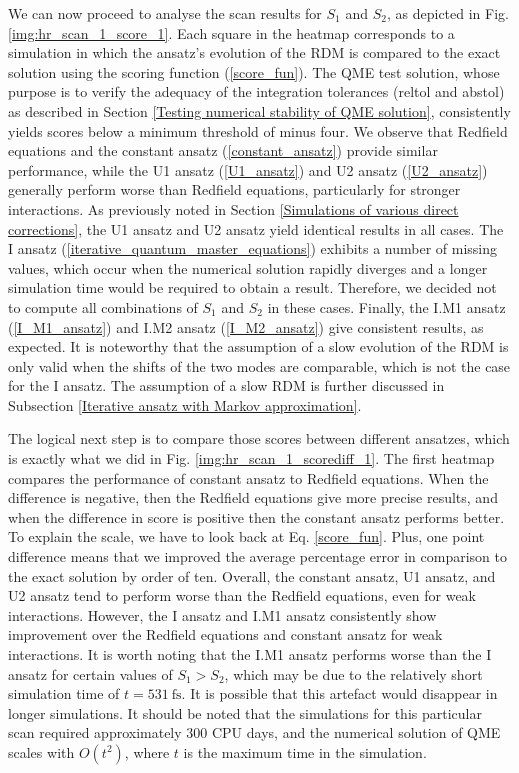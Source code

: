 We can now proceed to analyse the scan results for $S_1$ and $S_2$, as depicted in Fig. \ref{img:hr_scan_1_score_1}. Each square in the heatmap corresponds to a simulation in which the ansatz's evolution of the RDM is compared to the exact solution using the scoring function (\ref{score_fun}). The QME test solution, whose purpose is to verify the adequacy of the integration tolerances (reltol and abstol) as described in Section \ref{Testing numerical stability of QME solution}, consistently yields scores below a minimum threshold of minus four. We observe that Redfield equations and the constant ansatz (\ref{constant_ansatz}) provide similar performance, while the U1 ansatz (\ref{U1_ansatz}) and U2 ansatz (\ref{U2_ansatz}) generally perform worse than Redfield equations, particularly for stronger interactions. As previously noted in Section \ref{Simulations of various direct corrections}, the U1 ansatz and U2 ansatz yield identical results in all cases. The I ansatz (\ref{iterative_quantum_master_equations}) exhibits a number of missing values, which occur when the numerical solution rapidly diverges and a longer simulation time would be required to obtain a result. Therefore, we decided not to compute all combinations of $S_1$ and $S_2$ in these cases. Finally, the I.M1 ansatz (\ref{I_M1_ansatz}) and I.M2 ansatz (\ref{I_M2_ansatz}) give consistent results, as expected. It is noteworthy that the assumption of a slow evolution of the RDM is only valid when the shifts of the two modes are comparable, which is not the case for the I ansatz. The assumption of a slow RDM is further discussed in Subsection \ref{Iterative ansatz with Markov approximation}. 

The logical next step is to compare those scores between different ansatzes, which is exactly what we did in Fig. \ref{img:hr_scan_1_scorediff_1}. The first heatmap compares the performance of constant ansatz to Redfield equations. When the difference is negative, then the Redfield equations give more precise results, and when the difference in score is positive then the constant ansatz performs better. To explain the scale, we have to look back at Eq. \ref{score_fun}. Plus, one point difference means that we improved the average percentage error in comparison to the exact solution by order of ten.  Overall, the constant ansatz, U1 ansatz, and U2 ansatz tend to perform worse than the Redfield equations, even for weak interactions. However, the I ansatz and I.M1 ansatz consistently show improvement over the Redfield equations and constant ansatz for weak interactions. It is worth noting that the I.M1 ansatz performs worse than the I ansatz for certain values of $S_1 > S_2$, which may be due to the relatively short simulation time of $t = 531\:\mathrm{fs}$. It is possible that this artefact would disappear in longer simulations. It should be noted that the simulations for this particular scan required approximately 300 CPU days, and the numerical solution of QME scales with $O(t^2)$, where $t$ is the maximum time in the simulation. 


